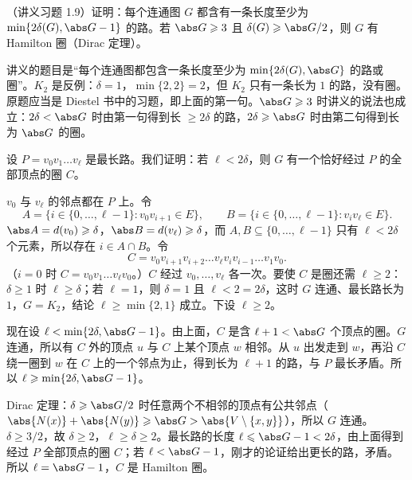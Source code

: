 \begin{workedexample}\label{we:longest-paths:dirac}
（讲义习题 1.9）证明：每个连通图 $G$ 都含有一条长度至少为 $\min\{2\delta(G),\abs G-1\}$ 的路。若 $\abs G\geqslant3$ 且 $\delta(G)\geqslant\abs G/2$，则 $G$ 有 Hamilton 圈（Dirac 定理）。
\end{workedexample}
\begin{remark}[讲义原题有误]
讲义的题目是“每个连通图都包含一条长度至少为 $\min\{2\delta(G),\abs G\}$ 的路或圈”。$K_2$ 是反例：$\delta=1$，$\min\{2,2\}=2$，但 $K_2$ 只有一条长为 $1$ 的路，没有圈。原题应当是 Diestel 书中的习题，即上面的第一句。$\abs G\geqslant3$ 时讲义的说法也成立：$2\delta<\abs G$ 时由第一句得到长 $\geqslant2\delta$ 的路，$2\delta\geqslant\abs G$ 时由第二句得到长为 $\abs G$ 的圈。
\end{remark}
\begin{solution}
设 $P=v_0v_1\dots v_\ell$ 是最长路。我们证明：若 $\ell<2\delta$，则 $G$ 有一个恰好经过 $P$ 的全部顶点的圈 $C$。

$v_0$ 与 $v_\ell$ 的邻点都在 $P$ 上。令
\[
A=\{i\in\{0,\dots,\ell-1\}: v_0v_{i+1}\in E\},\qquad B=\{i\in\{0,\dots,\ell-1\}: v_iv_\ell\in E\}.
\]
$\abs A=d(v_0)\geqslant\delta$，$\abs B=d(v_\ell)\geqslant\delta$，而 $A,B\subseteq\{0,\dots,\ell-1\}$ 只有 $\ell<2\delta$ 个元素，所以存在 $i\in A\cap B$。令
\[
C=v_0v_{i+1}v_{i+2}\dots v_\ell v_iv_{i-1}\dots v_1v_0 .
\]
（$i=0$ 时 $C=v_0v_1\dots v_\ell v_0$。）$C$ 经过 $v_0,\dots,v_\ell$ 各一次。要使 $C$ 是圈还需 $\ell\geqslant2$：$\delta\geqslant1$ 时 $\ell\geqslant\delta$；若 $\ell=1$，则 $\delta=1$ 且 $\ell<2=2\delta$，这时 $G$ 连通、最长路长为 $1$，$G=K_2$，结论 $\ell\geqslant\min\{2,1\}$ 成立。下设 $\ell\geqslant2$。

现在设 $\ell<\min\{2\delta,\abs G-1\}$。由上面，$C$ 是含 $\ell+1<\abs G$ 个顶点的圈。$G$ 连通，所以有 $C$ 外的顶点 $u$ 与 $C$ 上某个顶点 $w$ 相邻。从 $u$ 出发走到 $w$，再沿 $C$ 绕一圈到 $w$ 在 $C$ 上的一个邻点为止，得到长为 $\ell+1$ 的路，与 $P$ 最长矛盾。所以 $\ell\geqslant\min\{2\delta,\abs G-1\}$。

Dirac 定理：$\delta\geqslant\abs G/2$ 时任意两个不相邻的顶点有公共邻点（$\abs{N(x)}+\abs{N(y)}\geqslant\abs G>\abs{V\setminus\{x,y\}}$），所以 $G$ 连通。$\delta\geqslant3/2$，故 $\delta\geqslant2$，$\ell\geqslant\delta\geqslant2$。最长路的长度 $\ell\leqslant\abs G-1<2\delta$，由上面得到经过 $P$ 全部顶点的圈 $C$；若 $\ell<\abs G-1$，刚才的论证给出更长的路，矛盾。所以 $\ell=\abs G-1$，$C$ 是 Hamilton 圈。
\end{solution}

